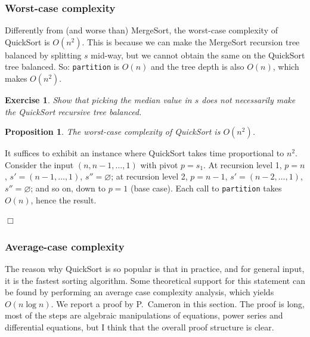 \documentclass[a4paper]{book}
\theoremstyle{changebreak}                %
\newtheorem{prop}[result]{Proposition}
\newtheorem{ex}[result]{Exercise}
\newenvironment{proof}
 {{\sl Proof.}\hspace*{1 ex}}%
 {{\nopagebreak\hspace*{\fill}$\Box$\par\vspace{12pt}}}
\begin{document}
\subsubsection{Worst-case complexity}
Differently from (and worse than) {\sc
  MergeSort}, the worst-case
complexity of {\sc QuickSort} is
$O(n^2)$. This is because we can make the {\sc
  MergeSort}
recursion tree balanced by
splitting $s$ mid-way, but we cannot obtain the same on the {\sc
  QuickSort} tree balanced. So:
{\tt partition} is $O(n)$ and the tree depth is also $O(n)$, which
makes $O(n^2)$.

\begin{ex}
Show that picking the median value in $s$
does not necessarily make the {\sc QuickSort} recursive tree balanced.
\end{ex}

\begin{prop}
The worst-case complexity of {\sc QuickSort} is $O(n^2)$.
\end{prop}
\begin{proof}
It suffices to exhibit an instance where {\sc
  QuickSort} takes time proportional to $n^2$. Consider the
input $(n,n-1,\ldots,1)$ with pivot
$p=s_1$. At recursion level 1, $p=n$,
$s'=(n-1,\ldots,1)$, $s''=\varnothing$; at recursion level 2, $p=n-1$,
$s'=(n-2,\ldots,1)$, $s''=\varnothing$; and so on, down to $p=1$ (base
case). Each call to {\tt partition} takes $O(n)$, hence the result.
\end{proof}

\subsubsection{Average-case complexity}
The reason why {\sc QuickSort} is so
popular is that in practice, and for general
input, it is the fastest sorting
algorithm. Some theoretical support for this
statement can be found by performing an average case
complexity analysis, which yields
$O(n\log n)$. We report a proof by P.~Cameron
\cite{cameron2} in this section. The proof is long, most of the steps
are algebraic manipulations of equations, power
series and differential
equations, but I think that the overall
proof structure is clear.
\end{document}
